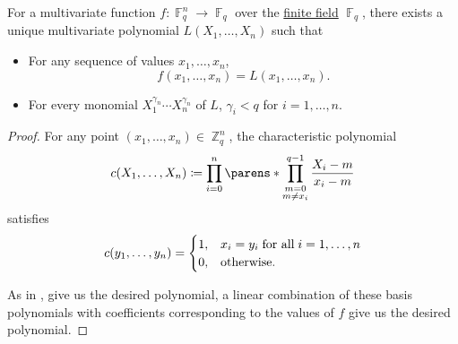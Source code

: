 \begin{theorem}\label{thm:finite_field_lagrange_interpolation}
  For a multivariate function \( f: \BbbF_q^n \to \BbbF_q \) over the \hyperref[thm:finite_fields]{finite field} \( \BbbF_q \), there exists a unique multivariate polynomial \( L(X_1, \ldots, X_n) \) such that
  \begin{itemize}
    \item For any sequence of values \( x_1, \ldots, x_n \),
    \begin{equation*}
      f(x_1, \ldots, x_n) = L(x_1, \ldots, x_n).
    \end{equation*}

    \item For every monomial \( X_1^{\gamma_n} \cdots X_n^{\gamma_n} \) of \( L \), \( \gamma_i < q \) for \( i = 1, \ldots, n \).
  \end{itemize}
\end{theorem}
\begin{proof}
  For any point \( (x_1, \ldots, x_n) \in \BbbZ_q^n \), the characteristic polynomial
  \begin{equation*}
    c(X_1, \ldots, X_n) \coloneqq \prod_{i=0}^n \parens*{ \prod_{\substack{m=0 \\ m \neq x_i}}^{q - 1} \frac {X_i - m} {x_i - m} }
  \end{equation*}
  satisfies
  \begin{equation*}
    c(y_1, \ldots, y_n) = \begin{cases}
      1, &x_i = y_i \T{for all} i = 1, \ldots, n \\
      0, &\T{otherwise.}
    \end{cases}
  \end{equation*}

  As in , give us the desired polynomial, a linear combination of these basis polynomials with coefficients corresponding to the values of \( f \) give us the desired polynomial.
\end{proof}
